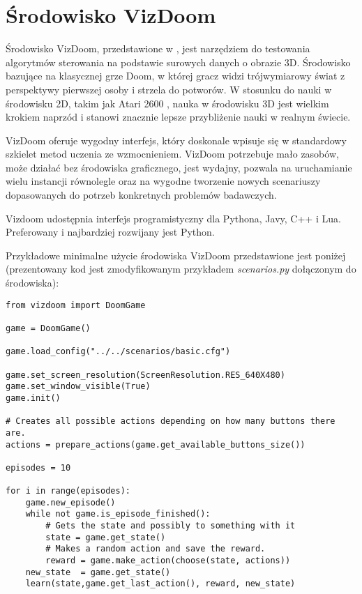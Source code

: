 \section{Środowisko VizDoom}

Środowisko VizDoom, przedstawione w \cite{DBLP:journals/corr/KempkaWRTJ16}, jest narzędziem do testowania algorytmów sterowania na podstawie surowych danych o obrazie 3D. Środowisko bazujące na klasycznej grze Doom, w której gracz widzi trójwymiarowy świat z perspektywy pierwszej osoby i strzela do potworów. W stosunku do nauki w środowisku 2D, takim jak Atari 2600 \cite{mnih2015human}, nauka w środowisku  3D jest wielkim krokiem naprzód i stanowi znacznie lepsze przybliżenie nauki w realnym świecie.

VizDoom oferuje wygodny interfejs, który doskonale wpisuje się w standardowy szkielet metod uczenia ze wzmocnieniem. VizDoom potrzebuje mało zasobów, może działać bez środowiska graficznego, jest wydajny, pozwala na uruchamianie wielu instancji równolegle oraz na wygodne tworzenie nowych scenariuszy dopasowanych do potrzeb konkretnych problemów badawczych.

Vizdoom udostępnia interfejs programistyczny dla Pythona, Javy, C++ i Lua. Preferowany i najbardziej rozwijany jest Python.

Przykładowe minimalne użycie środowiska VizDoom przedstawione jest poniżej (prezentowany kod jest zmodyfikowanym przykładem \textit{scenarios.py} dołączonym do środowiska):

\begin{lstlisting}[language=iPython]
from vizdoom import DoomGame

game = DoomGame()

game.load_config("../../scenarios/basic.cfg")

game.set_screen_resolution(ScreenResolution.RES_640X480)
game.set_window_visible(True)
game.init()

# Creates all possible actions depending on how many buttons there are.
actions = prepare_actions(game.get_available_buttons_size())

episodes = 10

for i in range(episodes):
    game.new_episode()
    while not game.is_episode_finished():
        # Gets the state and possibly to something with it
        state = game.get_state()
        # Makes a random action and save the reward.
        reward = game.make_action(choose(state, actions))
	new_state  = game.get_state() 
	learn(state,game.get_last_action(), reward, new_state)
\end{lstlisting}
